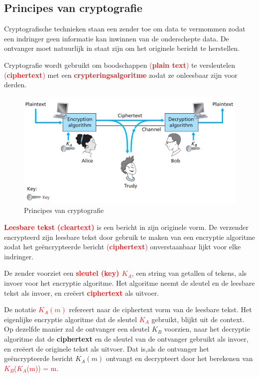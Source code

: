 \newpage
\subsection{Principes van cryptografie}
\noindent Cryptografische technieken staan een zender toe om data te vermommen zodat een indringer geen informatie kan inwinnen van de onderschepte data. De ontvanger moet natuurlijk in staat zijn om het originele bericht te herstellen.

\noindent Cryptografie wordt gebruikt om boodschappen \textcolor{red}{(\textbf{plain text})} te versleutelen \textcolor{red}{(\textbf{ciphertext})} met een \textcolor{red}{\textbf{crypteringsalgoritme}} zodat ze onleesbaar zijn voor derden.

\begin{figure}[h]
    \centering
     \includegraphics[width=7in]{./img/imghfdst8/Figure8-2.PNG}
    \caption{Principes van cryptografie }      
    \label{fig:Principes van cryptografie }
\end{figure}

\noindent \textcolor{red}{\textbf{Leesbare tekst (cleartext)}} is een bericht in zijn originele vorm. De verzender encrypteerd zijn leesbare tekst door gebruik te maken van een encryptie algoritme zodat het geëncrypteerde bericht \textcolor{red}{(\textbf{ciphertext})} onverstaanbaar lijkt voor elke indringer. 

\noindent De zender voorziet een \textcolor{red}{\textbf{sleutel (key) $K_A$}}, een string van getallen of tekens, als invoer voor het encryptie algoritme. Het algoritme neemt de sleutel en de leesbare tekst als invoer, en creëert \textcolor{red}{\textbf{ciphertext}} als uitvoer.

\noindent De notatie \textcolor{red}{$K_A (m)$} refereert naar de ciphertext vorm van de leesbare tekst. Het eigenlijke encryptie algoritme dat de sleutel \textcolor{red}{$K_A $} gebruikt, blijkt uit de context.
Op dezelfde manier zal de ontvanger een sleutel $K_B$ voorzien, naar het decryptie algoritme dat de \textbf{ciphertext} en de sleutel van de ontvanger gebruikt als invoer, en creëert de originele tekst als uitvoer.
Dat is,als de ontvanger het geëncrypteerde bericht $K_A (m) $ ontvangt en decrypteert door het berekenen van \textcolor{red}{$K_B$($K_A$(m)) = m}.

